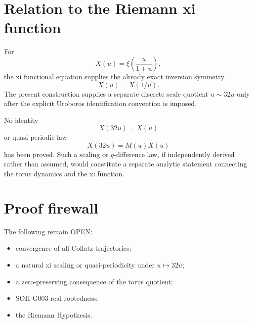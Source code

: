 \section{Relation to the Riemann xi function}

For
\[
X(u)=\xi\!\left(\frac{u}{1+u}\right),
\]
the xi functional equation supplies the already exact inversion symmetry
\[
\boxed{X(u)=X(1/u).}
\]
The present construction supplies a separate discrete scale quotient $u\sim32u$ only after the explicit Uroboros identification convention is imposed.

No identity
\[
X(32u)=X(u)
\]
or quasi-periodic law
\[
X(32u)=M(u)X(u)
\]
has been proved. Such a scaling or $q$-difference law, if independently derived rather than assumed, would constitute a separate analytic statement connecting the torus dynamics and the xi function.

\section{Proof firewall}

The following remain OPEN:
\begin{itemize}
\item convergence of all Collatz trajectories;
\item a natural xi scaling or quasi-periodicity under $u\mapsto32u$;
\item a zero-preserving consequence of the torus quotient;
\item SOH-G003 real-rootedness;
\item the Riemann Hypothesis.
\end{itemize}
